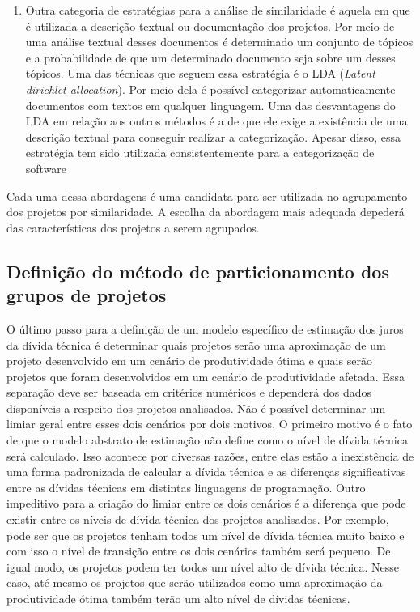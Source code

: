 \begin{enumerate}
\item Outra categoria de estratégias para a análise de similaridade é aquela em que é utilizada a descrição textual ou documentação dos projetos. Por meio de uma análise textual desses documentos é determinado um conjunto de tópicos e a probabilidade de que um determinado documento seja sobre um desses tópicos. Uma das técnicas que seguem essa estratégia é o LDA (\textit{Latent dirichlet allocation})\cite{blei2002latent}. Por meio dela é possível categorizar automaticamente documentos com textos em qualquer linguagem. Uma das desvantagens do LDA em relação aos outros métodos é a de que ele exige a existência de uma descrição textual para conseguir realizar a categorização. Apesar disso, essa estratégia tem sido utilizada consistentemente para a categorização de software\cite{chen2012explaining,tian2009using,maskeri2008mining,kelly2011recovering} 

 \end{enumerate}
 
 Cada uma dessa abordagens é uma candidata para ser utilizada no agrupamento dos projetos por similaridade. A escolha da abordagem mais adequada depederá das características dos projetos a serem agrupados. 



\subsection{Definição do método de particionamento dos grupos de projetos}


 O último passo para a definição de um modelo específico de estimação dos juros da dívida técnica é determinar quais projetos serão uma aproximação de um projeto desenvolvido em um cenário de produtividade ótima e quais serão projetos que foram desenvolvidos em um cenário de produtividade afetada. Essa separação deve ser baseada em critérios numéricos e dependerá dos dados disponíveis a respeito dos projetos analisados.  Não é possível determinar um limiar geral entre esses dois cenários por dois motivos. O primeiro motivo é o fato de que o modelo abstrato de estimação não define como o nível de dívida técnica será calculado. Isso acontece por diversas razões, entre elas estão a inexistência de uma forma padronizada de calcular a dívida técnica e as diferenças significativas entre as dívidas técnicas em distintas linguagens de programação. Outro impeditivo para a criação do limiar entre os dois cenários é a diferença que pode existir entre os níveis de dívida técnica dos projetos analisados. Por exemplo, pode ser que os projetos tenham todos um nível de dívida técnica muito baixo e com isso o nível de transição entre os dois cenários também será pequeno. De igual modo, os projetos podem ter todos um nível alto de dívida técnica. Nesse caso, até mesmo os projetos que serão utilizados como uma aproximação da produtividade ótima também terão um alto nível de dívidas técnicas.
 
